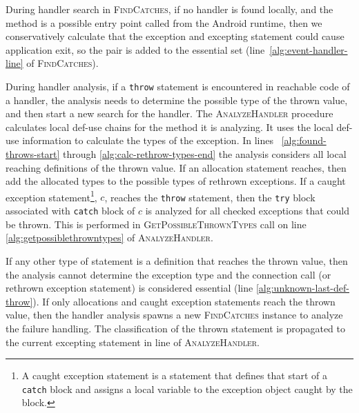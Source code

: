 During handler search in \textsc{FindCatches}, if no handler is found
locally, and the method is a possible entry point called from the
Android runtime, then we conservatively calculate that the exception
and excepting statement could cause application exit, so the pair is
added to the essential set (line~\ref{alg:event-handler-line} of
\textsc{FindCatches}). 

During handler analysis, if a \lstinline!throw! statement is
encountered in reachable code of a handler, the analysis needs to
determine the possible type of the thrown value, and then start a new
search for the handler.  The \textsc{AnalyzeHandler} procedure
calculates local def-use chains for the method it is analyzing.  It
uses the local def-use information to calculate the types of the
exception.  In lines ~\ref{alg:found-throws-start} through
\ref{alg:calc-rethrow-types-end} the analysis considers all local
reaching definitions of the thrown value.  If an allocation statement
reaches, then add the allocated types to the possible types of
rethrown exceptions. If a caught exception statement\footnote{A caught
  exception statement is a statement that defines that start of a
  \lstinline!catch! block and assigns a local variable to the
  exception object caught by the block.}, $c$, reaches the
\lstinline!throw! statement, then the \lstinline!try! block associated
with \lstinline!catch! block of $c$ is analyzed for all checked
exceptions that could be thrown.  This is performed in
\textsc{GetPossibleThrownTypes} call on line
\ref{alg:getpossiblethrowntypes} of \textsc{AnalyzeHandler}.

If any other type of statement is a definition that reaches the thrown
value, then the analysis cannot determine the exception type and the
connection call (or rethrown exception statement) is considered
essential (line \ref{alg:unknown-last-def-throw}).  If only
allocations and caught exception statements reach the thrown value,
then the handler analysis spawns a new \textsc{FindCatches} instance
to analyze the failure handling.  The classification of the thrown
statement is propagated to the current excepting statement in
line \label{alg:progagate-line} of \textsc{AnalyzeHandler}.

